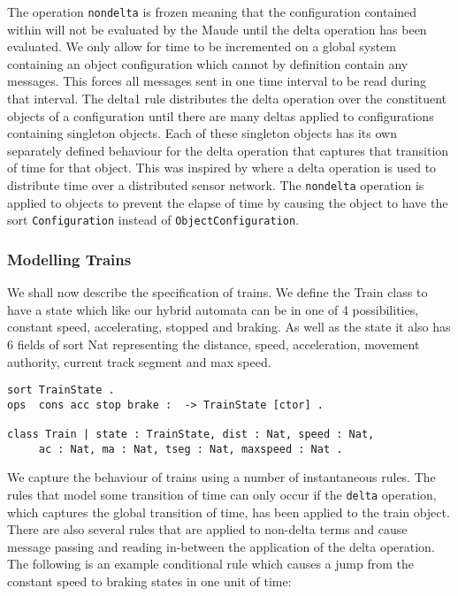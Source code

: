 The operation \texttt{nondelta} is frozen meaning that the configuration contained within will not be evaluated by the Maude until the $\mathrm{delta}$ operation has been evaluated. We only allow for time to be incremented on a global system containing an object configuration which cannot by definition contain any messages. This forces all messages sent in one time interval to be read during that interval. The delta1 rule distributes the delta operation over the constituent objects of a configuration until there are many deltas applied to configurations containing singleton objects. Each of these singleton objects has its own separately defined behaviour for the delta operation that captures that transition of time for that object. This was inspired by  \cite{PO07} where a delta operation is used to distribute time over a distributed sensor network. The \texttt{nondelta} operation is applied to objects to prevent the elapse of time by causing the object to have the sort \texttt{Configuration} instead of \texttt{ObjectConfiguration}.

\subsubsection*{Modelling Trains}
We shall now describe the specification of trains. We define the Train class to have a state which like our hybrid automata can be in one of 4 possibilities, constant speed, accelerating, stopped and braking. As well as the state it also has 6 fields of sort Nat representing the distance, speed, acceleration, movement authority,  current track segment and max speed.

\begin{lstlisting}
sort TrainState .
ops  cons acc stop brake :  -> TrainState [ctor] .

class Train | state : TrainState, dist : Nat, speed : Nat, 
     ac : Nat, ma : Nat, tseg : Nat, maxspeed : Nat .
\end{lstlisting}

We capture the behaviour of trains using a number of instantaneous rules. The rules that model some transition of time can only occur if the \texttt{delta} operation, which captures the global transition of time, has been applied to the train object. There are also several rules that are applied to non-delta terms and cause message passing and reading in-between the application of the delta operation. The following is an example conditional rule which causes a jump from the constant speed to braking states in one unit of time:


